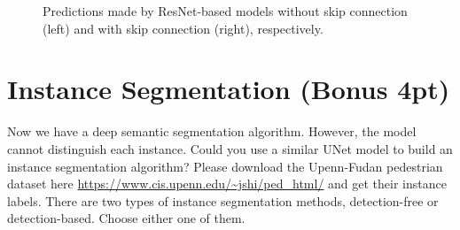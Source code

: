 \documentclass[11pt]{article}
\begin{document}
\begin{figure}[h]
    \centering
    \qquad
    \caption{Predictions made by ResNet-based models without skip connection (left) and with skip connection (right), respectively.}
    \label{fig:pred-ResnetBasedModel]}
\end{figure}


\section*{Instance Segmentation (Bonus 4pt)}

Now we have a deep semantic segmentation algorithm. However, the model cannot distinguish each instance. Could you use a similar UNet model to build an instance segmentation algorithm? Please download the Upenn-Fudan pedestrian dataset here \url{https://www.cis.upenn.edu/~jshi/ped_html/} and get their instance labels. There are two types of instance segmentation methods, detection-free or detection-based. Choose either one of them. 
\end{document}
